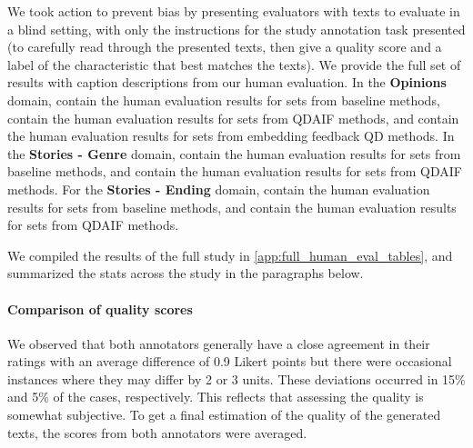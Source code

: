 We took action to prevent bias by presenting evaluators with texts to evaluate in a blind setting, with only the instructions for the study annotation task presented (to carefully read through the presented texts, then give a quality score and a label of the characteristic that best matches the texts). We provide the full set of results with caption descriptions from our human evaluation. In the \textbf{Opinions} domain,  contain the human evaluation results for sets from baseline methods,  contain the human evaluation results for sets from QDAIF methods, and  contain the human evaluation results for sets from embedding feedback QD methods. In the \textbf{Stories - Genre} domain,  contain the human evaluation results for sets from baseline methods, and  contain the human evaluation results for sets from QDAIF methods. For the \textbf{Stories - Ending} domain,  contain the human evaluation results for sets from baseline methods, and  contain the human evaluation results for sets from QDAIF methods.

We compiled the results of the full study in \cref{app:full_human_eval_tables}, and summarized the stats across the study in the paragraphs below.

\paragraph{Comparison of quality scores}
We observed that both annotators generally have a close agreement in their ratings with an average difference of 0.9 Likert points but there were occasional instances where they may differ by 2 or 3 units. These deviations occurred in 15\% and 5\% of the cases, respectively. This reflects that assessing the quality is somewhat subjective. To get a final estimation of the quality of the generated texts, the scores from both annotators were averaged.

